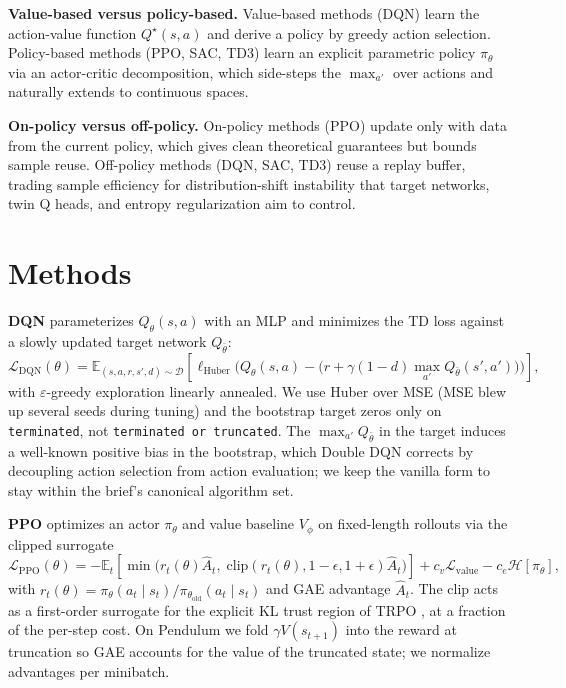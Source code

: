 \documentclass[10pt,a4paper]{article}
\begin{document}
\textbf{Value-based versus policy-based.} Value-based methods (DQN) learn the action-value function $Q^{\star}(s, a)$ and derive a policy by greedy action selection. Policy-based methods (PPO, SAC, TD3) learn an explicit parametric policy $\pi_\theta$ via an actor-critic decomposition, which side-steps the $\max_{a'}$ over actions and naturally extends to continuous spaces.

\textbf{On-policy versus off-policy.} On-policy methods (PPO) update only with data from the current policy, which gives clean theoretical guarantees but bounds sample reuse. Off-policy methods (DQN, SAC, TD3) reuse a replay buffer, trading sample efficiency for distribution-shift instability that target networks, twin Q heads, and entropy regularization aim to control.


\section{Methods}

\textbf{DQN} \cite{mnih2013playing} parameterizes $Q_\theta(s, a)$ with an MLP and minimizes the TD loss against a slowly updated target network $Q_{\bar{\theta}}$:
\begin{equation}
\mathcal{L}_{\text{DQN}}(\theta) = \mathbb{E}_{(s,a,r,s',d) \sim \mathcal{D}}\!\left[\ell_{\text{Huber}}\!\Big(Q_\theta(s,a) - \big(r + \gamma(1 - d)\textstyle\max_{a'} Q_{\bar{\theta}}(s', a')\big)\Big)\right],
\label{eq:dqn}
\end{equation}
with $\varepsilon$-greedy exploration linearly annealed. We use Huber over MSE (MSE blew up several seeds during tuning) and the bootstrap target zeros only on \texttt{terminated}, not \texttt{terminated or truncated}. The $\max_{a'} Q_{\bar{\theta}}$ in the target induces a well-known positive bias in the bootstrap, which Double DQN \cite{vanhasselt2016double} corrects by decoupling action selection from action evaluation; we keep the vanilla form to stay within the brief's canonical algorithm set.

\textbf{PPO} \cite{schulman2017proximal} optimizes an actor $\pi_\theta$ and value baseline $V_\phi$ on fixed-length rollouts via the clipped surrogate
\begin{equation}
\mathcal{L}_{\text{PPO}}(\theta) = -\mathbb{E}_{t}\!\left[\min\!\Big(r_t(\theta) \hat{A}_t,\; \mathrm{clip}(r_t(\theta), 1 - \epsilon, 1 + \epsilon) \hat{A}_t\Big)\right] + c_{v} \mathcal{L}_{\text{value}} - c_{e} \mathcal{H}[\pi_\theta],
\label{eq:ppo}
\end{equation}
with $r_t(\theta) = \pi_\theta(a_t \mid s_t)/\pi_{\theta_{\text{old}}}(a_t \mid s_t)$ and GAE advantage $\hat{A}_t$. The clip acts as a first-order surrogate for the explicit KL trust region of TRPO \cite{schulman2015trust}, at a fraction of the per-step cost. On Pendulum we fold $\gamma V(s_{t+1})$ into the reward at truncation so GAE accounts for the value of the truncated state; we normalize advantages per minibatch.
\end{document}
